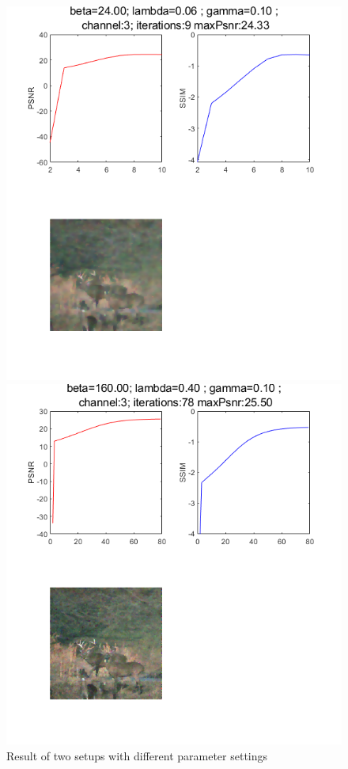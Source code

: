 \begin{figure}[H]
    \centering
    \begin{minipage}[b]{0.45\textwidth}
    \includegraphics[scale=0.6]{images/statTest3.png}
    \end{minipage}
    \hfill
    \begin{minipage}[b]{0.45\textwidth}
    \includegraphics[scale=0.6]{images/statTest1.png}
    \end{minipage}
    \caption{Result of two setups with different parameter settings}
    \label{fig1}
\end{figure}
